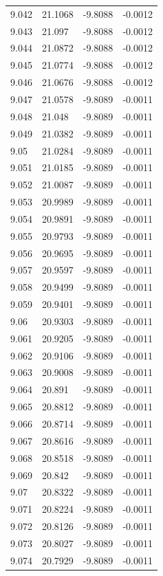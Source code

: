 \begin{tabular}{llll}
9.042 & 21.1068 & -9.8088 & -0.0012 \\
9.043 & 21.097 & -9.8088 & -0.0012 \\
9.044 & 21.0872 & -9.8088 & -0.0012 \\
9.045 & 21.0774 & -9.8088 & -0.0012 \\
9.046 & 21.0676 & -9.8088 & -0.0012 \\
9.047 & 21.0578 & -9.8089 & -0.0011 \\
9.048 & 21.048 & -9.8089 & -0.0011 \\
9.049 & 21.0382 & -9.8089 & -0.0011 \\
9.05 & 21.0284 & -9.8089 & -0.0011 \\
9.051 & 21.0185 & -9.8089 & -0.0011 \\
9.052 & 21.0087 & -9.8089 & -0.0011 \\
9.053 & 20.9989 & -9.8089 & -0.0011 \\
9.054 & 20.9891 & -9.8089 & -0.0011 \\
9.055 & 20.9793 & -9.8089 & -0.0011 \\
9.056 & 20.9695 & -9.8089 & -0.0011 \\
9.057 & 20.9597 & -9.8089 & -0.0011 \\
9.058 & 20.9499 & -9.8089 & -0.0011 \\
9.059 & 20.9401 & -9.8089 & -0.0011 \\
9.06 & 20.9303 & -9.8089 & -0.0011 \\
9.061 & 20.9205 & -9.8089 & -0.0011 \\
9.062 & 20.9106 & -9.8089 & -0.0011 \\
9.063 & 20.9008 & -9.8089 & -0.0011 \\
9.064 & 20.891 & -9.8089 & -0.0011 \\
9.065 & 20.8812 & -9.8089 & -0.0011 \\
9.066 & 20.8714 & -9.8089 & -0.0011 \\
9.067 & 20.8616 & -9.8089 & -0.0011 \\
9.068 & 20.8518 & -9.8089 & -0.0011 \\
9.069 & 20.842 & -9.8089 & -0.0011 \\
9.07 & 20.8322 & -9.8089 & -0.0011 \\
9.071 & 20.8224 & -9.8089 & -0.0011 \\
9.072 & 20.8126 & -9.8089 & -0.0011 \\
9.073 & 20.8027 & -9.8089 & -0.0011 \\
9.074 & 20.7929 & -9.8089 & -0.0011 \\

\end{tabular}
